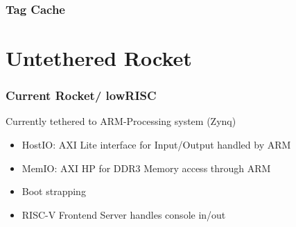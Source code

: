 \documentclass{beamer}
\begin{document}
\begin{frame}
	\frametitle{Tag Cache}
\begin{figure}[!h]
	\begin{center}
	\end{center}
	\end{figure}
\end{frame}

\section{Untethered Rocket}
\begin{frame}
	\frametitle{Current Rocket/ lowRISC}
	Currently tethered to ARM-Processing system (Zynq)
	\begin{itemize}
	\item HostIO: AXI Lite interface for Input/Output handled by ARM
	\item MemIO: AXI HP for DDR3 Memory access through ARM
	\item Boot strapping
	\item RISC-V Frontend Server handles console in/out
	\end{itemize}
\end{frame}
\end{document}
